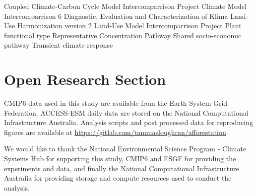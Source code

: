 \documentclass[draft]{agujournal2019}
\begin{document}
%


\begin{acronyms}
     Coupled Climate-Carbon Cycle Model Intercomparrison Project
     Climate Model Intercomparrison 6
     Diagnostic, Evaluation and Characterization of Klima
     Land-Use Harmonization version 2
     Land-Use Model Intercomparrison Project
     Plant functional type
     Representative Concentration Pathway
     Shared socio-economic pathway
     Transient climate response
\end{acronyms}






%
%

\section*{Open Research Section}
CMIP6 data used in this study are available from the Earth System Grid Federation.
ACCESS-ESM daily data are stored on the National Computational Infrastructure Australia. Analysis scripts and post processed data for reproducing figures are available at \url{https://gitlab.com/tammasloughran/afforestation}.

\acknowledgments
We would like to thank the National Environmental Science Program - Climate Systems Hub for supporting this study, CMIP6 and ESGF for providing the experiments and data, and finally the National Computational Infrastructure Australia for providing storage and compute resources used to conduct the analysis.
\end{document}
